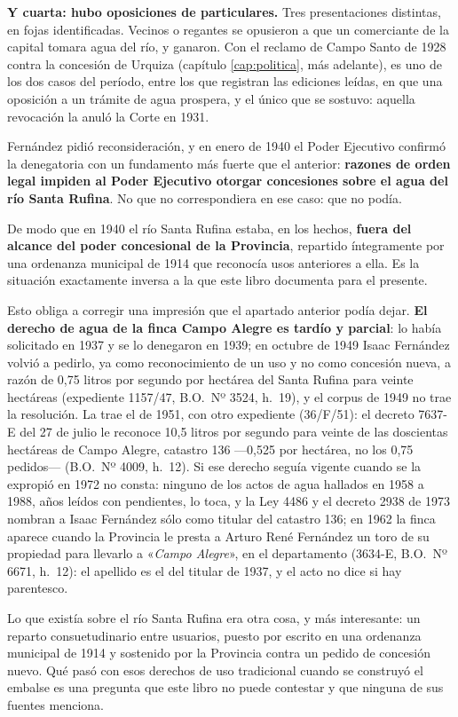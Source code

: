 \textbf{Y cuarta: hubo oposiciones de particulares.} Tres presentaciones distintas, en fojas
identificadas. Vecinos o regantes se opusieron a que un comerciante de la capital tomara agua
del río, y ganaron. Con el reclamo de Campo Santo de 1928 contra la concesión de Urquiza (capítulo \ref{cap:politica}, más adelante), es uno de los dos casos del período, entre los que registran las ediciones leídas, en que una oposición a un trámite de agua prospera, y el único que se sostuvo: aquella revocación la anuló la Corte en 1931.

Fernández pidió reconsideración, y en enero de 1940 el Poder Ejecutivo confirmó la
denegatoria con un fundamento más fuerte que el anterior: \textbf{razones de orden legal
impiden al Poder Ejecutivo otorgar concesiones sobre el agua del río Santa Rufina}. No que
no correspondiera en ese caso: que no podía.

De modo que en 1940 el río Santa Rufina estaba, en los hechos, \textbf{fuera del alcance del
poder concesional de la Provincia}, repartido íntegramente por una ordenanza municipal de
1914 que reconocía usos anteriores a ella. Es la situación exactamente inversa a la que este
libro documenta para el presente.

\begin{cautela}
Esto obliga a corregir una impresión que el apartado anterior podía dejar. \textbf{El derecho de agua
de la finca Campo Alegre es tardío y parcial}: lo había
solicitado en 1937 y se lo denegaron en 1939; en octubre de 1949 Isaac Fernández volvió a pedirlo, ya como reconocimiento de un uso y no como concesión nueva, a razón de 0,75 litros por segundo por hectárea del Santa Rufina para veinte hectáreas (expediente 1157/47, B.O.\ Nº 3524, h.\ 19), y el corpus de 1949 no trae la resolución. La trae el de 1951, con otro expediente (36/F/51): el decreto 7637-E del 27 de julio le reconoce 10,5 litros por segundo para veinte de las doscientas hectáreas de Campo Alegre, catastro 136 ---0,525 por hectárea, no los 0,75 pedidos--- (B.O.\ Nº 4009, h.\ 12). Si ese derecho seguía vigente cuando se la expropió en 1972 no consta: ninguno de los actos de agua hallados en 1958 a 1988, años leídos con pendientes, lo toca, y la Ley 4486 y el decreto 2938 de 1973 nombran a Isaac Fernández sólo como titular del catastro 136; en 1962 la finca aparece cuando la Provincia le presta a Arturo René Fernández un toro de su propiedad para llevarlo a «\textit{Campo Alegre}», en el departamento (3634-E, B.O.\ Nº 6671, h.\ 12): el apellido es el del titular de 1937, y el acto no dice si hay parentesco.

Lo que existía sobre el río Santa Rufina era otra cosa, y más interesante: un reparto
consuetudinario entre usuarios, puesto por escrito en una ordenanza municipal de 1914 y
sostenido por la Provincia contra un pedido de concesión nuevo. Qué pasó con esos derechos
de uso tradicional cuando se construyó el embalse es una pregunta que este libro no puede
contestar y que ninguna de sus fuentes menciona.
\end{cautela}

